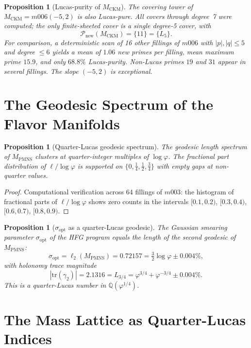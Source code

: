\documentclass[12pt]{article}
\newtheorem{proposition}[theorem]{Proposition}
\theoremstyle{definition}
\newcommand{\Q}{\mathbb{Q}}
\newcommand{\ph}{\varphi}
\newcommand{\logph}{\log\ph}
\begin{document}
\begin{proposition}[Lucas-purity of $M_{\mathrm{CKM}}$]
\label{prop:ckm}
The covering tower of $M_{\mathrm{CKM}} = m006(-5,2)$ is also
Lucas-pure. All covers through degree~7 were computed; the only
finite-sheeted cover is a single degree-5 cover, with
\[
  \mathcal{P}_{\mathrm{new}}(M_{\mathrm{CKM}}) = \{11\} = \{L_5\}.
\]
For comparison, a deterministic scan of 16 other fillings of $m006$
with $|p|,|q|\leq 5$ and degree $\leq 6$ yields a mean of $1.06$
new primes per filling, mean maximum prime $15.9$, and only $68.8\%$
Lucas-purity. Non-Lucas primes $19$ and $31$ appear in several fillings.
The slope $(-5,2)$ is exceptional.
\end{proposition}

\section{The Geodesic Spectrum of the Flavor Manifolds}

\begin{proposition}[Quarter-Lucas geodesic spectrum]
\label{prop:quarter-lucas}
The geodesic length spectrum of $M_{\mathrm{PMNS}}$ clusters at
quarter-integer multiples of $\logph$. The fractional part
distribution of $\ell/\logph$ is supported on $\{0, \tfrac{1}{4},
\tfrac{1}{2}, \tfrac{3}{4}\}$ with empty gaps at non-quarter values.
\end{proposition}

\begin{proof}
Computational verification across 64 fillings of $m003$: the
histogram of fractional parts of $\ell/\logph$ shows zero counts in
the intervals $[0.1,0.2)$, $[0.3,0.4)$, $[0.6,0.7)$, $[0.8,0.9)$.
\end{proof}

\begin{proposition}[$\sigma_{\mathrm{opt}}$ as a quarter-Lucas geodesic]
\label{prop:sigma}
The Gaussian smearing parameter $\sigma_{\mathrm{opt}}$ of the HFG
program equals the length of the second geodesic of $M_{\mathrm{PMNS}}$:
\[
  \sigma_{\mathrm{opt}} = \ell_2(M_{\mathrm{PMNS}}) = 0.72157
  = \tfrac{3}{2}\logph \pm 0.004\%,
\]
with holonomy trace magnitude
\[
  |\mathrm{tr}(\gamma_2)| = 2.1316
  = L_{3/4} = \ph^{3/4} + \ph^{-3/4} \pm 0.004\%.
\]
This is a quarter-Lucas number in $\Q(\ph^{1/4})$.
\end{proposition}

\section{The Mass Lattice as Quarter-Lucas Indices}
\end{document}
